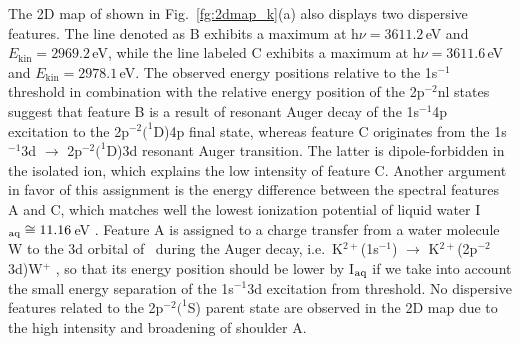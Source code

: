 
{\color{blue} The 2D map of \ki shown in Fig.\ \ref{fg:2dmap_k}(a) also displays two dispersive features. The line denoted as B exhibits a maximum at h$\nu = 3611.2$\,eV and $E_{\text{kin}} = 2969.2$\,eV, while the line labeled C exhibits a maximum at h$\nu = 3611.6$\,eV and $E_{\text{kin}} = 2978.1$\,eV. The observed energy positions relative to the \ki 1s$^{-1}$ threshold in combination with the relative energy position of the 2p$^{-2}$nl states suggest that feature B is a result of resonant Auger decay of the 1s$^{-1}$4p excitation to the 2p$^{-2}(^1$D)4p final state, whereas feature C originates from the 1s$^{-1}$3d $\rightarrow$ 2p$^{-2}(^1$D)3d resonant Auger transition. The latter is dipole-forbidden in the isolated ion, which explains the low intensity of feature C. %
Another argument in favor of this assignment is the energy difference between the spectral features A and C, which matches well the lowest ionization potential of liquid water I$_{\rm aq} \cong 11.16$\,eV \cite{winter04:2625}. Feature A is assigned to a charge transfer from a water molecule W to the 3d orbital of \ki~during the Auger decay, i.e.\ K$^{2+}$(1s$^{-1}$) $\rightarrow$ K$^{2+}$(2p$^{-2}$3d)W$^{+}$ \citep{ceolin17:263003}, so that its energy position should be lower by I$_{\rm aq}$ if we take into account the small energy separation of the 1s$^{-1}$3d excitation from threshold. No dispersive features related to the 2p$^{-2}(^1$S) parent state are observed in the 2D map due to the high intensity and broadening of shoulder A.} 





